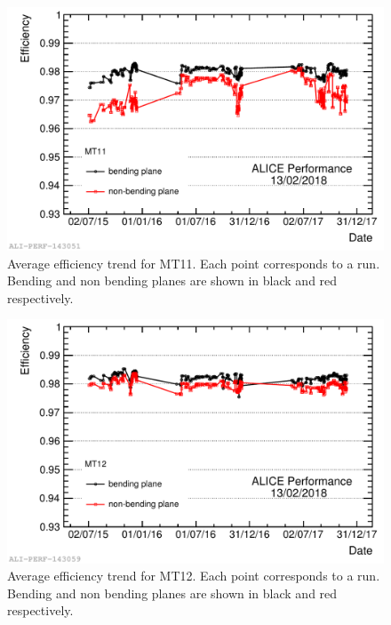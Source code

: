 \begin{figure}[!ht]
\begin{center}
\includegraphics[width=0.8\linewidth]{Chapters/Performance/Figs/2018-Feb-16-effTrend_2015-2017_Ch11.pdf}
\caption{Average efficiency trend for MT11. Each point corresponds to a run. Bending and non bending planes are shown in black and red respectively.}
\label{fig:MTR11efficiency}
\end{center}
\end{figure}

\begin{figure}[!ht]
\begin{center}
\includegraphics[width=0.8\linewidth]{Chapters/Performance/Figs/2018-Feb-16-effTrend_2015-2017_Ch12.pdf}
\caption{Average efficiency trend for MT12. Each point corresponds to a run. Bending and non bending planes are shown in black and red respectively.}
\label{fig:MTR12efficiency}
\end{center}
\end{figure}

